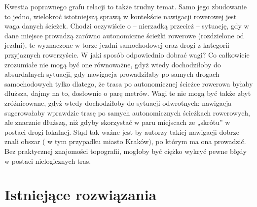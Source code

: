 Kwestia poprawnego grafu relacji to także trudny temat. Samo jego zbudowanie to jedno, wielokroć istotniejszą sprawą w kontekście nawigacji rowerowej jest waga danych ścieżek. Chodzi oczywiście o – nierzadką przecież – sytuację, gdy w dane miejsce prowadzą zarówno autonomiczne ścieżki rowerowe (rozdzielone od jezdni), te wyznaczone w torze jezdni samochodowej oraz drogi z kategorii przyjaznych rowerzyście. W jaki sposób odpowiednio dobrać wagi? Co całkowicie zrozumiałe nie mogą być one równoważne, gdyż wtedy dochodziłoby do absurdalnych sytuacji, gdy nawigacja prowadziłaby po samych drogach samochodowych tylko dlatego, że trasa po autonomicznej ścieżce rowerowa byłaby dłuższa, dajmy na to, dosłownie o parę metrów. Wagi te nie mogą być także zbyt zróżnicowane, gdyż wtedy dochodziłoby do sytuacji odwrotnych: nawigacja sugerowałaby wprawdzie trasę po samych autonomicznych ścieżkach rowerowych, ale znacznie dłuższą, niż gdyby skorzystać w paru miejscach ze „skrótu” w postaci drogi lokalnej. Stąd tak ważne jest by autorzy takiej nawigacji dobrze znali obszar ( w tym przypadku miasto Kraków), po którym ma ona prowadzić. Bez praktycznej znajomości topografii, mogłoby być ciężko wykryć pewne błędy w postaci nielogicznych tras.

\section{Istniejące rozwiązania}

